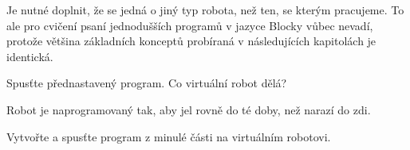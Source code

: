 \documentclass[../main.tex]{subfiles}
\begin{document}
	Je nutné doplnit, že se jedná o jiný typ robota, než ten, se kterým pracujeme. To ale pro cvičení psaní jednodušších programů v jazyce Blocky vůbec nevadí, protože většina základních konceptů probíraná v následujících kapitolách je identická.

	\begin{question}
		Spusťte přednastavený program. Co virtuální robot dělá?
	\end{question}

	\begin{solution}
		Robot je naprogramovaný tak, aby jel rovně do té doby, než narazí do zdi.
	\end{solution}

	\begin{question}
		Vytvořte a spusťte program z minulé části na virtuálním robotovi.
	\end{question}
\end{document}
